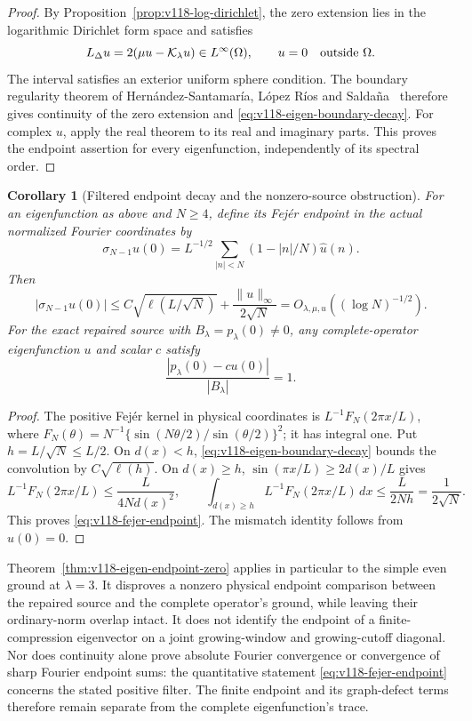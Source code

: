 \documentclass[11pt]{article}
\newtheorem{corollary}[theorem]{Corollary}
\theoremstyle{remark}
\begin{document}
\begin{proof}
By Proposition~\ref{prop:v118-log-dirichlet}, the zero extension lies
in the logarithmic Dirichlet form space and satisfies
\[
 L_\Delta u=2(\mu u-\mathcal K_\lambda u)\in L^\infty(\Omega),
 \qquad u=0\quad\hbox{outside }\Omega.
\]
The interval satisfies an exterior uniform sphere condition.
The boundary regularity theorem of Hern\'andez-Santamar\'ia,
L\'opez R\'ios and Salda\~na~\cite[Theorem~1.1]{HLSLogBoundary}
therefore gives continuity of the zero extension and
\eqref{eq:v118-eigen-boundary-decay}.  For complex $u$, apply the
real theorem to its real and imaginary parts.  This proves the endpoint
assertion for every eigenfunction, independently of its spectral order.
\end{proof}

\begin{corollary}[Filtered endpoint decay and the nonzero-source obstruction]
\label{cor:v118-ground-fejer}
For an eigenfunction as above and $N\ge4$, define its Fej\'er endpoint
in the actual normalized Fourier coordinates by
\[
 \sigma_{N-1}u(0)=L^{-1/2}
       \sum_{|n|<N}(1-|n|/N)\widehat u(n).
\]
Then
\begin{equation}\label{eq:v118-fejer-endpoint}
 |\sigma_{N-1}u(0)|
 \le C\sqrt{\ell(L/\sqrt N)}+\frac{\|u\|_\infty}{2\sqrt N}
 =O_{\lambda,\mu,u}((\log N)^{-1/2}).
\end{equation}
For the exact repaired source with $B_\lambda=p_\lambda(0)\ne0$,
any complete-operator eigenfunction $u$ and scalar $c$ satisfy
\begin{equation}\label{eq:v118-ground-source-mismatch}
 \frac{|p_\lambda(0)-cu(0)|}{|B_\lambda|}=1.
\end{equation}
\end{corollary}
\begin{proof}
The positive Fej\'er kernel in physical coordinates is
$L^{-1}F_N(2\pi x/L)$, where
$F_N(\theta)=N^{-1}\{\sin(N\theta/2)/\sin(\theta/2)\}^2$;
it has integral one.  Put $h=L/\sqrt N\le L/2$.
On $d(x)<h$, \eqref{eq:v118-eigen-boundary-decay} bounds the
convolution by $C\sqrt{\ell(h)}$.
On $d(x)\ge h$, $\sin(\pi x/L)\ge2d(x)/L$ gives
\[
 L^{-1}F_N(2\pi x/L)\le\frac{L}{4N d(x)^2},\qquad
 \int_{d(x)\ge h}L^{-1}F_N(2\pi x/L)\,dx
       \le\frac{L}{2Nh}=\frac1{2\sqrt N}.
\]
This proves \eqref{eq:v118-fejer-endpoint}.
The mismatch identity follows from $u(0)=0$.
\end{proof}

Theorem~\ref{thm:v118-eigen-endpoint-zero} applies in particular to
the simple even ground at $\lambda=3$.  It disproves a nonzero physical
endpoint comparison between the repaired source and the complete
operator's ground, while leaving their ordinary-norm overlap intact.
It does not identify the endpoint of a finite-compression eigenvector
on a joint growing-window and growing-cutoff diagonal.
Nor does continuity alone prove absolute Fourier convergence or
convergence of sharp Fourier endpoint sums: the quantitative statement
\eqref{eq:v118-fejer-endpoint} concerns the stated positive filter.
The finite endpoint and its graph-defect terms therefore remain
separate from the complete eigenfunction's trace.
\end{document}
